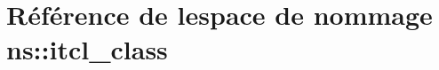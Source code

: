 \hypertarget{namespacens_1_1itcl__class}{}\section{Référence de l\textquotesingle{}espace de nommage ns\+:\+:itcl\+\_\+class}
\label{namespacens_1_1itcl__class}
